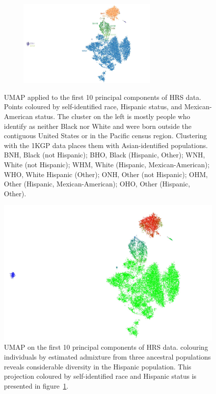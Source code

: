 \documentclass[12pt]{pnas-new}
\begin{document}
\begin{figure}
    \centering
    \begin{subfigure}{0.95\textwidth}
    \includegraphics[width=0.75\textwidth]{images/HRS_1000G_NP1_UMAP_PC10_NC2_NN15_MD05_pca_1kgp_onto_hrs_umap_1kgp_onto_hrs_2018112221116_race_hisp_mex_labels.pdf}
    \end{subfigure}
    \caption{UMAP applied to the first 10 principal components of HRS data. Points coloured by self-identified race, Hispanic status, and Mexican-American status. The cluster on the left is mostly people who identify as neither Black nor White and were born outside the contiguous United States or in the Pacific census region. Clustering with the 1KGP data places them with Asian-identified populations. BNH, Black (not Hispanic); BHO, Black (Hispanic, Other); WNH, White (not Hispanic); WHM, White (Hispanic, Mexican-American); WHO, White Hispanic (Other); ONH, Other (not Hispanic); OHM, Other (Hispanic, Mexican-American); OHO, Other (Hispanic, Other).}
    \label{fig:supp_umap_hrs_eth}
\end{figure}

\begin{figure}
\centering
   \includegraphics[width=0.6\linewidth]{images/HRS_1000G_NP1_UMAP_PC10_NC2_NN15_MD05_pca_1kgp_onto_hrs_umap_1kgp_onto_hrs_2018112221116_admix.pdf}
   \caption{UMAP on the first 10 principal components of HRS data. colouring individuals by estimated admixture from three ancestral populations reveals considerable diversity in the Hispanic population. This projection coloured by self-identified race and Hispanic status is presented in figure~\ref{fig:supp_umap_hrs_eth}.}
    \label{fig:umap_hrs_admix}
\end{figure}
\end{document}

